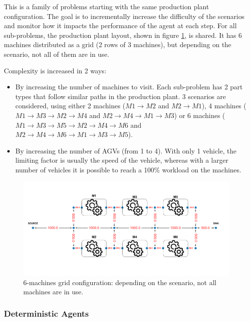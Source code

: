 \documentclass[sn-mathphys]{sn-jnl}
\begin{document}
This is a family of problems starting with the same production plant configuration. The goal is to incrementally increase the difficulty of the scenarios and monitor how it impacts the performance of the agent at each step. For all sub-problems, the production plant layout, shown in figure \ref{fig:plan_grid_6_machines}, is shared. It has 6 machines distributed as a grid (2 rows of 3 machines), but depending on the scenario, not all of them are in use.


Complexity is increased in 2 ways:
\begin{itemize}
    \item By increasing the number of machines to visit. Each sub-problem has 2 part types that follow similar paths in the production plant. 3 scenarios are considered, using either 2 machines ($M1 \rightarrow M2$ and $M2 \rightarrow M1$), 4 machines ($M1 \rightarrow M3 \rightarrow M2 \rightarrow M4$ and $M2 \rightarrow M4 \rightarrow M1 \rightarrow M3$) or 6 machines ($M1 \rightarrow M3 \rightarrow M5 \rightarrow M2 \rightarrow M4 \rightarrow M6$ and $M2 \rightarrow M4 \rightarrow M6 \rightarrow M1 \rightarrow M3 \rightarrow M5$).
    \item By increasing the number of AGVs (from 1 to 4). With only 1 vehicle, the limiting factor is usually the speed of the vehicle, whereas with a larger number of vehicles it is possible to reach a 100\% workload on the machines.
\end{itemize}

\begin{figure}[ht]
  \includegraphics[width=1.0\textwidth]{plan_grid_6_machines.png}
  \caption{6-machines grid configuration: depending on the scenario, not all machines are in use.}
  \label{fig:plan_grid_6_machines}
\end{figure}

\subsubsection{Deterministic Agents}
\end{document}
